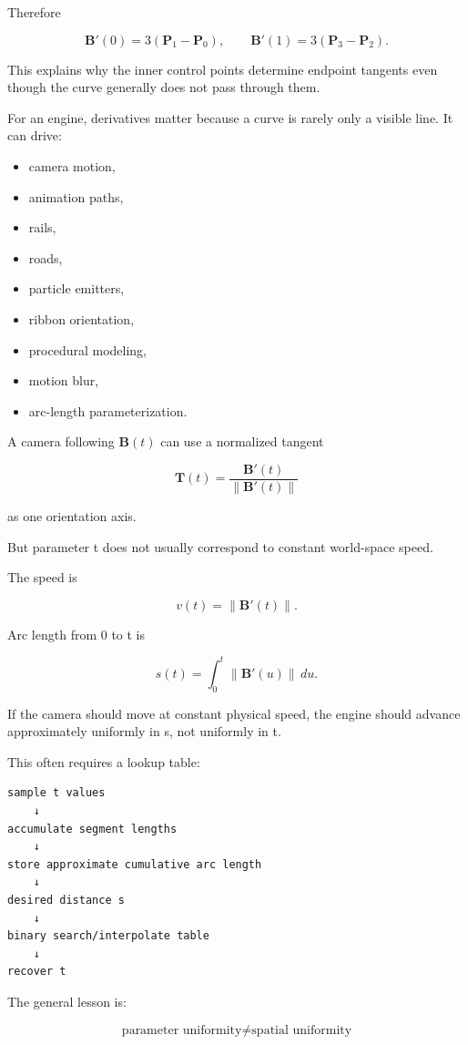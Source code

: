 Therefore

\[
\mathbf B'(0)=3(\mathbf P_1-\mathbf P_0),
\qquad
\mathbf B'(1)=3(\mathbf P_3-\mathbf P_2).
\]

This explains why the inner control points determine endpoint tangents even though the curve generally does not pass through them.

For an engine, derivatives matter because a curve is rarely only a visible line. It can drive:

\begin{itemize}
\tightlist
\item
  camera motion,
\item
  animation paths,
\item
  rails,
\item
  roads,
\item
  particle emitters,
\item
  ribbon orientation,
\item
  procedural modeling,
\item
  motion blur,
\item
  arc-length parameterization.
\end{itemize}

A camera following \(\mathbf B(t)\) can use a normalized tangent

\[
\mathbf T(t)=
\frac{\mathbf B'(t)}
{\|\mathbf B'(t)\|}
\]

as one orientation axis.

But parameter t does not usually correspond to constant world-space speed.

The speed is

\[
v(t)=\|\mathbf B'(t)\|.
\]

Arc length from 0 to t is

\[
s(t)=\int_0^t\|\mathbf B'(u)\|\,du.
\]

If the camera should move at constant physical speed, the engine should advance approximately uniformly in s, not uniformly in t.

This often requires a lookup table:

\begin{verbatim}
sample t values
    ↓
accumulate segment lengths
    ↓
store approximate cumulative arc length
    ↓
desired distance s
    ↓
binary search/interpolate table
    ↓
recover t
\end{verbatim}

The general lesson is:

\[
\boxed{
\text{parameter uniformity}
\neq
\text{spatial uniformity}
}
\]

